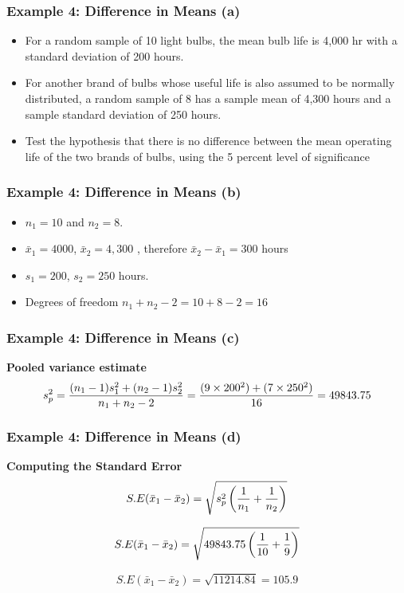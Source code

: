 

\begin{frame}
\frametitle{Example 4: Difference in Means (a) }
\begin{itemize}
\item For a random sample of 10 light bulbs, the mean bulb life is 4,000 hr with a standard deviation of 200 hours.
\item For another brand of bulbs whose useful life is also assumed to be normally distributed, a random sample of 8 has a sample mean of 4,300 hours
and a sample standard deviation of 250 hours. \item Test the hypothesis that there is no difference between the
mean operating life of the two brands of bulbs, using the 5 percent level of significance
\end{itemize}
\end{frame}

\begin{frame}
\frametitle{Example 4: Difference in Means (b) }
\begin{itemize}\item $n_1 = 10$ and $n_2 = 8$.
\item $\bar{x}_1 = 4000$, $\bar{x}_2 = 4,300 $ , therefore  $\bar{x}_2 - \bar{x}_1 = 300$ hours
\item $s_1  = 200$, $s_2 = 250$ hours.
\item Degrees of freedom $n_1 + n_2 - 2 = 10 + 8 - 2 = 16$
\end{itemize}\end{frame}
\begin{frame}
\frametitle{Example 4: Difference in Means (c) }
\textbf{Pooled variance estimate}
\[ s^2_p = {(n_1 - 1)s^2_1  + (n_2 - 1)s^2_ 2\over n_1 + n_2 - 2 } = {(9 \times 200^2 ) +( 7 \times 250^2) \over 16 } = 49843.75 \]

\end{frame}
\begin{frame}
\frametitle{Example 4: Difference in Means (d) }
\textbf{Computing the Standard Error}
\[ S.E(\bar{x}_1 - \bar{x}_2) = \sqrt{s^2_p \left({1\over n_1}+{1\over n_2} \right)}\]

\[ S.E(\bar{x}_1 - \bar{x}_2) = \sqrt{49843.75 \left({1\over 10}+{1\over 9} \right)}\]

\[ S.E(\bar{x}_1 - \bar{x}_2) = \sqrt{11214.84} = 105.9\]

\end{frame}

